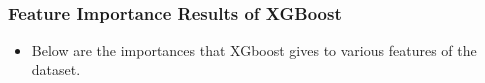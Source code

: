 \documentclass[11pt]{article}
\providecommand{\tightlist}{%
      \setlength{\itemsep}{0pt}\setlength{\parskip}{0pt}}
\begin{document}
    \begin{center}
    \end{center}
    { \hspace*{\fill} \\}
    
    \hypertarget{feature-importance-results-of-xgboost}{%
\subsubsection{Feature Importance Results of
XGBoost}\label{feature-importance-results-of-xgboost}}

\begin{itemize}
\tightlist
\item
  Below are the importances that XGboost gives to various features of
  the dataset.
\end{itemize}
\end{document}
